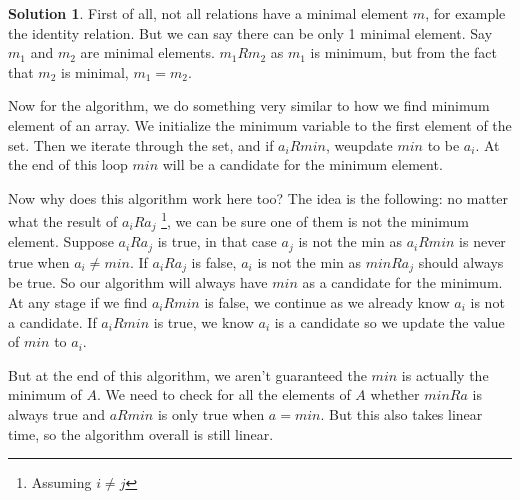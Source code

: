 \documentclass[a4paper,10pt]{article}
\theoremstyle{definition} %
\newtheorem*{solution}{Solution}
\begin{document}
    \begin{solution}
        First of all, not all relations have a minimal element $m$, for example the identity relation. But we can say there can 
        be only 1 minimal element. Say $m_1$ and $m_2$ are minimal elements. $m_1Rm_2$ as $m_1$ is minimum, but from the fact
        that $m_2$ is minimal, $m_1 = m_2$.

        Now for the algorithm, we do something very similar to how we find minimum element of an array. We initialize the minimum
        variable to the first element of the set. Then we iterate through the set, and if $a_iRmin$, weupdate $min$ to be $a_i$. 
        At the end of this loop $min$ will be a candidate for the minimum element. 

        Now why does this algorithm work here too? The idea is the following: no matter what the result of $a_iRa_j$ \footnote{Assuming $i \neq j$}, we can be sure
        one of them is not the minimum element. Suppose $a_iRa_j$ is true, in that case $a_j$ is not the min as $a_iRmin$ is never true when $a_i \neq min$. If 
        $a_iRa_j$ is false, $a_i$ is not the min as $minRa_j$ should always be true. So our algorithm will always have $min$ as a candidate for the minimum. At any 
        stage if we find $a_iRmin$ is false, we continue as we already know $a_i$ is not a candidate. If $a_iRmin$ is true, we know $a_i$ is a candidate so we update 
        the value of $min$ to $a_i$.

        But at the end of this algorithm, we aren't guaranteed the $min$ is actually the minimum of $A$. We need to check for all the elements of $A$ whether $minRa$
        is always true and $aRmin$ is only true when $a = min$. But this also takes linear time, so the algorithm overall is still linear.
    \end{solution}
\end{document}
